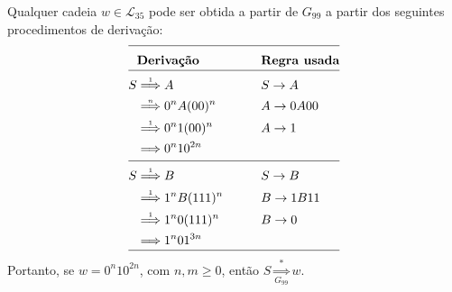 \documentclass[12pt]{article}
\def\myling{{35}} %
\newcommand{\deriv}[1]{\stackrel{\scriptscriptstyle #1}{\Longrightarrow}}
\newcommand{\derivG}[2]{\mathop{\Longrightarrow}\limits_{\scriptscriptstyle #2}^{\scriptscriptstyle #1}}
\begin{document}
\begin{tcolorbox}[breakable,rounded corners, colback=yellow!5, colframe=red!40!black, title={$\mathcal{L}_{\myling} \subseteq\mathcal{L}(G_{99})$, ou seja, se $w\in \mathcal{L}_{\myling}$, então $S \deriv{*} w$.}]
Qualquer cadeia $w\in \mathcal{L}_{\myling}$ pode ser obtida a partir de $G_{99}$ a partir dos seguintes procedimentos de derivação:
		\begin{alignat*}{2}
		\cline{1-4}
		   & \textbf{Derivação}   &\qquad& \textbf{Regra usada}\\[-10pt]
		\cline{1-4}
		 S & \deriv{1} A                & &S \to A\\ 
		   & \deriv{n} 0^nA(00)^n                & &A \to 0A00 \\
     & \deriv{1} 0^n1(00)^n   & &A \to 1 \\ 
		   & \deriv{}  0^n10^{2n} & & \\[-8pt]
		\cline{1-4}
		 S & \deriv{1} B                         & & S \to B \\
	    & \deriv{1} 1^nB(111)^n             & & B \to 1B11 \\ 
     & \deriv{1} 1^n0(111)^n             & & B \to 0 \\ 
		   & \deriv{}  1^n01^{3n}          & & \\[-10pt]
		\cline{1-4}
		\end{alignat*}
  Portanto, se $w = 0^n10^{2n}$, com $n,m \geqslant 0$, então $S \derivG{*}{G_{99}} w$.
\end{tcolorbox}
\end{document}
